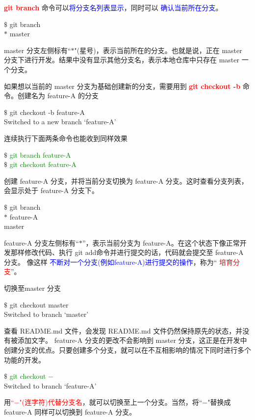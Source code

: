 \documentclass[12pt,a4paper]{article}
\begin{document}
\textcolor{red}{\bf git branch} 命令可以\textcolor{blue}{将分支名列表显示}，同时可以 \textcolor{blue}{确认当前所在分支}。
\begin{tcolorbox}[colback=green!5,colframe=green!40!black,title= ]
$\$$ git branch \\
$\ast$ master
\end{tcolorbox}
master 分支左侧标有``$\ast$"(星号)，表示当前所在的分支。也就是说，正在 master 分支下进行开发。结果中没有显示其他分支名，表示本地仓库中只存在 master 一个分支。

如果想以当前的 master 分支为基础创建新的分支，需要用到 \textcolor{red}{\bf git checkout -b} 命令。创建名为 feature-A 的分支
\begin{tcolorbox}[colback=green!5,colframe=green!40!black,title= ]
$\$$ git checkout -b feature-A \\
Switched to a new branch `feature-A'
\end{tcolorbox}
连续执行下面两条命令也能收到同样效果
\begin{tcolorbox}[colback=green!5,colframe=green!40!black,title= ]
$\$$ \textcolor{green}{git branch feature-A} \\
$\$$ \textcolor{green}{git checkout feature-A}
\end{tcolorbox}
创建 feature-A 分支，并将当前分支切换为 feature-A 分支。这时查看分支列表，会显示处于 feature-A 分支下。
\begin{tcolorbox}[colback=green!5,colframe=green!40!black,title= ]
$\$$ git branch \\
$\ast$ feature-A \\
master 
\end{tcolorbox}
feature-A 分支左侧标有``$\ast$”，表示当前分支为 feature-A。在这个状态下像正常开发那样修改代码、执行 git add命令并进行提交的话，代码就会提交至 feature-A 分支。 像这样 \textcolor{blue}{不断对一个分支(例如feature-A)进行提交的操作}，称为`` \textcolor{red}{培育分支}”。

切换至master 分支
\begin{tcolorbox}[colback=green!5,colframe=green!40!black,title= ]
$\$$ git checkout master \\
Switched to branch `master'
\end{tcolorbox}
查看 README.md 文件，会发现 README.md 文件仍然保持原先的状态，并没有被添加文字。 feature-A 分支的更改不会影响到 master 分支，这正是在开发中创建分支的优点。只要创建多个分支，就可以在不互相影响的情况下同时进行多个功能的开发。
\begin{tcolorbox}[colback=green!5,colframe=green!40!black,title= ]
$\$$ \textcolor{green}{git checkout $-$} \\
Switched to branch `feature-A'
\end{tcolorbox}
用\textcolor{red}{``$-$"(连字符)代替分支名}，就可以切换至上一个分支。当然，将``$-$"替换成 feature-A 同样可以切换到 feature-A 分支。
\end{document}
